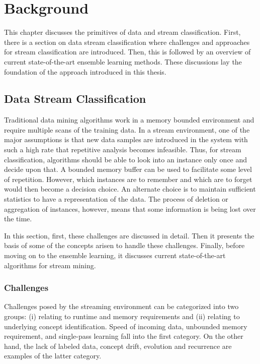 \chapter{Background}
\label{chp:background}
This chapter discusses the primitives of data and stream classification. First, there is a section on data stream classification where challenges and approaches for stream classification are introduced. Then, this is followed by an overview of current state-of-the-art ensemble learning methods. These discussions  lay the foundation of the approach introduced in this thesis.

\section{Data Stream Classification}
Traditional data mining algorithms work in a memory bounded environment and require multiple scans of the training data. In a stream environment, one of the major assumptions is that new data samples are introduced in the system with such a high rate that repetitive analysis becomes infeasible. Thus, for stream classification, algorithms should be able to look into an instance only once and decide upon that. A bounded memory buffer can be used to facilitate some level of repetition. However, which instances are to remember and which are to forget would then become a decision choice. An alternate choice is to maintain sufficient statistics to have a representation of the data. The process of deletion or aggregation of instances, however, means that some information is being lost over the time.

In this section, first, these challenges are discussed in detail. Then it presents the basis of some of the concepts arisen to handle these challenges. Finally, before moving on to the ensemble learning, it discusses current state-of-the-art algorithms for stream mining.

\subsection{Challenges}
Challenges posed by the streaming environment can be categorized into two groups: (i) relating to runtime and memory requirements and (ii) relating to underlying concept identification. Speed of incoming data, unbounded memory requirement, and single-pass learning fall into the first category. On the other hand, the lack of labeled data, concept drift, evolution and recurrence are examples of the latter category.

